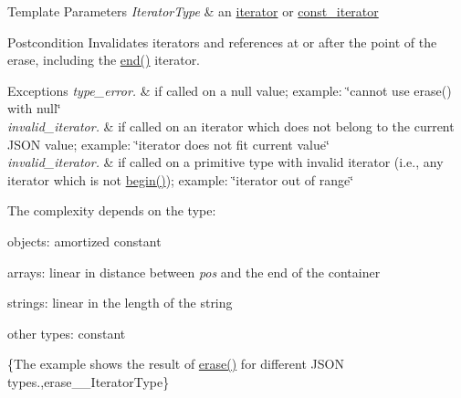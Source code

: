 \begin{DoxyTemplParams}{Template Parameters}
{\em Iterator\+Type} & an \mbox{\hyperlink{classnlohmann_1_1basic__json_a099316232c76c034030a38faa6e34dca}{iterator}} or \mbox{\hyperlink{classnlohmann_1_1basic__json_a41a70cf9993951836d129bb1c2b3126a}{const\+\_\+iterator}}\\
\hline
\end{DoxyTemplParams}
\begin{DoxyPostcond}{Postcondition}
Invalidates iterators and references at or after the point of the erase, including the {\ttfamily \mbox{\hyperlink{classnlohmann_1_1basic__json_a13e032a02a7fd8a93fdddc2fcbc4763c}{end()}}} iterator.
\end{DoxyPostcond}

\begin{DoxyExceptions}{Exceptions}
{\em type\+\_\+error.} & if called on a {\ttfamily null} value; example\+: {\ttfamily \char`\"{}cannot use
erase() with null\char`\"{}} \\
\hline
{\em invalid\+\_\+iterator.} & if called on an iterator which does not belong to the current J\+S\+ON value; example\+: {\ttfamily \char`\"{}iterator does not fit current
value\char`\"{}} \\
\hline
{\em invalid\+\_\+iterator.} & if called on a primitive type with invalid iterator (i.\+e., any iterator which is not {\ttfamily \mbox{\hyperlink{classnlohmann_1_1basic__json_a0ff28dac23f2bdecee9564d07f51dcdc}{begin()}}}); example\+: {\ttfamily \char`\"{}iterator
out of range\char`\"{}}\\
\hline
\end{DoxyExceptions}
The complexity depends on the type\+:
\begin{DoxyItemize}
\item objects\+: amortized constant
\item arrays\+: linear in distance between {\itshape pos} and the end of the container
\item strings\+: linear in the length of the string
\item other types\+: constant
\end{DoxyItemize}

\{The example shows the result of {\ttfamily \mbox{\hyperlink{classnlohmann_1_1basic__json_a068a16e76be178e83da6a192916923ed}{erase()}}} for different J\+S\+ON types.,erase\+\_\+\+\_\+\+Iterator\+Type\}

